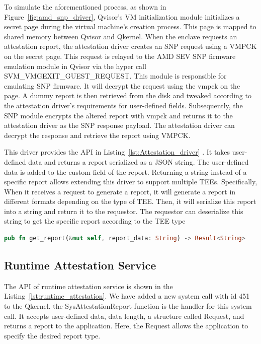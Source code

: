 To simulate the aforementioned process, as shown in Figure~\ref{fig:amd_snp_driver}, Qvisor's VM initialization module initializes a secret page during the virtual machine's creation process. This page is mapped to shared memory between Qvisor and Qkernel. When the enclave requests an attestation 
report, the attestation driver creates an  SNP request using a VMPCK on the secret page. This request is relayed to the AMD SEV SNP firmware emulation module in Qvisor via the hyper call SVM\_VMGEXIT\_GUEST\_REQUEST. This module is responsible for emulating SNP firmware. It will decrypt the request 
using the vmpck on the page. A dummy report is then retrieved from the disk and tweaked according to the attestation driver's requirements for user-defined fields. Subsequently, the SNP module encrypts the altered report with vmpck and returns it to the attestation driver as the SNP response payload. The attestation driver can 
decrypt the response and retrieve the report using VMPCK.

This driver provides the API in Listing~\ref{lst:Attestation_driver} . It takes user-defined data and returns a report serialized as a JSON string. The user-defined data is added to the custom field of the report. Returning a string instead of a specific report allows extending this driver to support multiple TEEs. Specifically,  
When it receives a request to generate a report, it will generate a report in different formats depending on the type of TEE. Then, it will serialize this report into a string and return it to the requestor. The requestor can deserialize this string to get the specific report according to the TEE type
\begin{lstlisting}[language=rust, caption= API of attestation driver, label={lst:Attestation_driver}]
pub fn get_report(&mut self, report_data: String) -> Result<String>   
\end{lstlisting}

\subsection{Runtime Attestation Service}
The API of runtime attestation service is shown in the Listing~\ref{lst:runtime_attestation}. We have added a new system call with id 451 to the Qkernel. the SysAttestationReport function is the handler for this system call. It accepts user-defined data, data length, a structure called Request, and returns a report to 
the application. Here, the Request allows the application to specify the desired report type.

